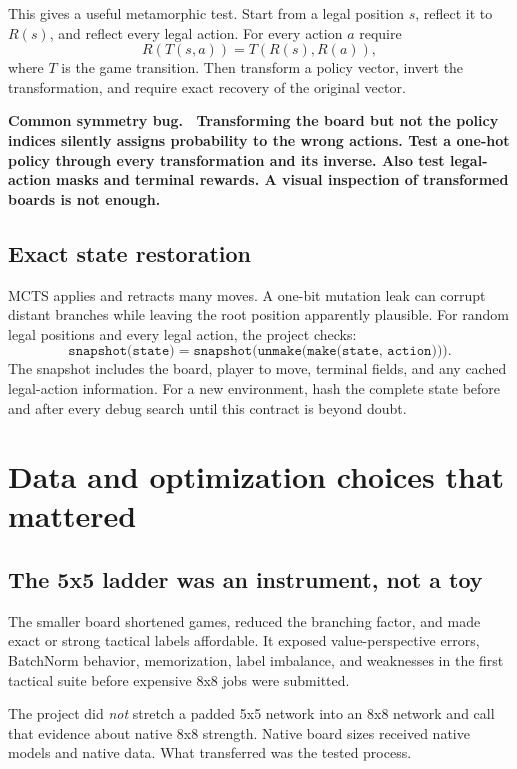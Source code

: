 \documentclass[10.5pt,letterpaper]{article}
\newcommand{\boxtitle}[1]{\sffamily\bfseries\color{deepblue}#1.\ }
\begin{document}
This gives a useful metamorphic test. Start from a legal position $s$, reflect
it to $R(s)$, and reflect every legal action. For every action $a$ require
\[
  R(T(s,a)) = T(R(s),R(a)),
\]
where $T$ is the game transition. Then transform a policy vector, invert the
transformation, and require exact recovery of the original vector.

\begin{warningbox}
\boxtitle{Common symmetry bug}
Transforming the board but not the policy indices silently assigns probability
to the wrong actions. Test a one-hot policy through every transformation and its
inverse. Also test legal-action masks and terminal rewards. A visual inspection
of transformed boards is not enough.
\end{warningbox}

\subsection{Exact state restoration}

MCTS applies and retracts many moves. A one-bit mutation leak can corrupt
distant branches while leaving the root position apparently plausible. For
random legal positions and every legal action, the project checks:
\[
  \texttt{snapshot(state)}
  =
  \texttt{snapshot(unmake(make(state, action)))}.
\]
The snapshot includes the board, player to move, terminal fields, and any cached
legal-action information. For a new environment, hash the complete state before
and after every debug search until this contract is beyond doubt.

\section{Data and optimization choices that mattered}

\subsection{The 5x5 ladder was an instrument, not a toy}

The smaller board shortened games, reduced the branching factor, and made exact
or strong tactical labels affordable. It exposed value-perspective errors,
BatchNorm behavior, memorization, label imbalance, and weaknesses in the first
tactical suite before expensive 8x8 jobs were submitted.

The project did \emph{not} stretch a padded 5x5 network into an 8x8 network and
call that evidence about native 8x8 strength. Native board sizes received
native models and native data. What transferred was the tested process.
\end{document}
